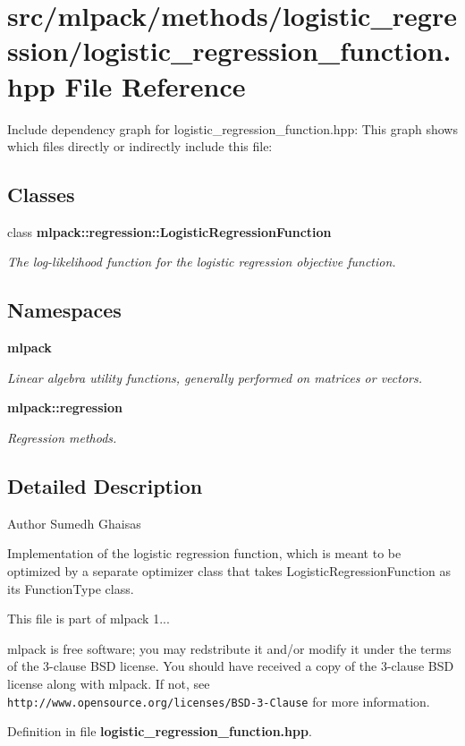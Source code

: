 \section{src/mlpack/methods/logistic\-\_\-regression/logistic\-\_\-regression\-\_\-function.hpp File Reference}
\label{logistic__regression__function_8hpp}
Include dependency graph for logistic\-\_\-regression\-\_\-function.\-hpp\-:
This graph shows which files directly or indirectly include this file\-:
\subsection*{Classes}
\begin{DoxyCompactItemize}
\item 
class {\bf mlpack\-::regression\-::\-Logistic\-Regression\-Function}
\begin{DoxyCompactList}\small\item\em The log-\/likelihood function for the logistic regression objective function. \end{DoxyCompactList}\end{DoxyCompactItemize}
\subsection*{Namespaces}
\begin{DoxyCompactItemize}
\item 
{\bf mlpack}
\begin{DoxyCompactList}\small\item\em Linear algebra utility functions, generally performed on matrices or vectors. \end{DoxyCompactList}\item 
{\bf mlpack\-::regression}
\begin{DoxyCompactList}\small\item\em Regression methods. \end{DoxyCompactList}\end{DoxyCompactItemize}


\subsection{Detailed Description}
\begin{DoxyAuthor}{Author}
Sumedh Ghaisas
\end{DoxyAuthor}
Implementation of the logistic regression function, which is meant to be optimized by a separate optimizer class that takes Logistic\-Regression\-Function as its Function\-Type class.

This file is part of mlpack 1...

mlpack is free software; you may redstribute it and/or modify it under the terms of the 3-\/clause B\-S\-D license. You should have received a copy of the 3-\/clause B\-S\-D license along with mlpack. If not, see {\tt http\-://www.\-opensource.\-org/licenses/\-B\-S\-D-\/3-\/\-Clause} for more information. 

Definition in file {\bf logistic\-\_\-regression\-\_\-function.\-hpp}.

